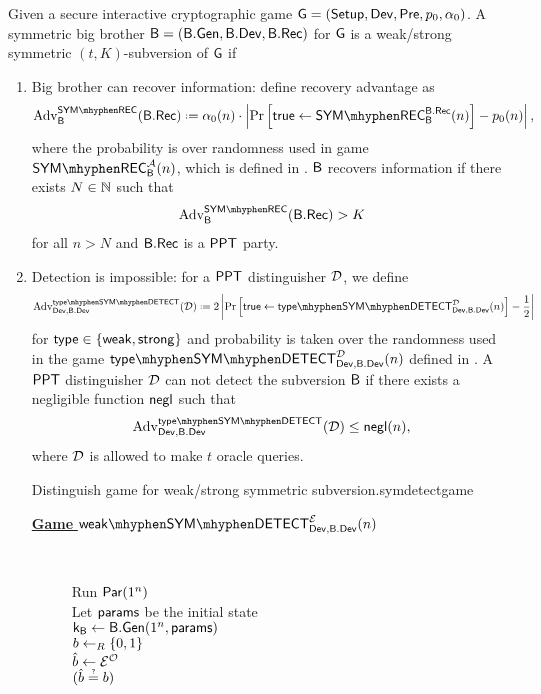 \begin{defn}
	Given a secure interactive cryptographic game $\operatorname{\mathsf{G}}=\left(\operatorname{\mathsf{Setup}},\operatorname{\mathsf{Dev}},\operatorname{\mathsf{Pre}},p_{0},\alpha_{0}\right)$. A symmetric big brother $\mathsf{B} = \left(\mathsf{B}.\mathsf{Gen},\mathsf{B}.\mathsf{Dev},\mathsf{B}.\mathsf{Rec}\right)$ for $\operatorname{\mathsf{G}}$ is a weak/strong symmetric $(t,K)$-subversion of $\operatorname{\mathsf{G}}$ if 
	\begin{enumerate}[1.]

		\item Big brother can recover information: define recovery advantage as
		\begin{align*} 
			\adv_{\bb}^{\symrecgame}(\bbrec)\defeq \secf(n)\cdot \left\vert \prob{\true\leftarrow \symrecgame_{\bb}^{\bbrec}(n)} - \basep(n)\right\vert,
		\end{align*}
		where the probability is over randomness used in game $\symrecgame_{\bb}^{\adve}(n)$, which is defined in . $\mathsf{B}$ recovers information if there exists $N\in\mathbb{N}$ such that
		\begin{align*}
			\adv_{\bb}^{\symrecgame}(\bbrec)>K
		\end{align*}
		for all $n>N$ and $\mathsf{B}.\mathsf{Rec}$ is a $\mathsf{PPT}$ party. 
		\item  Detection is impossible: for a $\mathsf{PPT}$ distinguisher $\operatorname{\mathcal{D}}$, we define 
		\begin{align*}
		\adv_{\dev,\bbdev}^{\symnotationtypedetect}(\dist) \defeq 2\left\vert \prob{\true\leftarrow \symtypedetect{\dev}{\bbdev}{\dist}}-\frac{1}{2}\right\vert 
		\end{align*}
		for $\mathsf{type}\in\{\mathsf{weak},\mathsf{strong}\}$ and probability is taken over the randomness used in the game $\symtypedetect{\dev}{\bbdev}{\dist}$ defined in . A $\mathsf{PPT}$ distinguisher $\operatorname{\mathcal{D}}$ can not detect the subversion $\mathsf{B}$ if there exists a negligible function $\operatorname{\mathsf{negl}}$ such that
		\begin{align*}
			\adv_{\dev,\bbdev}^{\symnotationtypedetect}(\dist)\leq \negl(n),
		\end{align*}
		where $\operatorname{\mathcal{D}}$ is allowed to make $t$ oracle queries.
		\begin{boxfigTwo}{Distinguish game for weak/strong symmetric subversion.}{symdetectgame}
\begin{minipage}{0.45\textwidth}
    \smallskip
	\begin{description}
 	\item[\underline{\textbf{Game} $\symweakdetect{\dev}{\bbdev}{\eve}$}] ~
 	
 	 	Run $\operatorname{\mathsf{Par}}(1^n)$\\
 		Let $\mathsf{params}$ be the initial state \\
 		$\mathsf{k}_{\mathsf{B}}\leftarrow \mathsf{B}.\mathsf{Gen}(1^n,\mathsf{params})$ \\
 		$b\leftarrow_R \{0,1\}$ \\
 		$\hat{b}\leftarrow \mathcal{E}^{\operatorname{\mathcal{O}}}$ \\
 		\Ret $\askequal{\hat{b}}{b}$


\end{description}
\end{minipage}
\end{boxfigTwo}
\end{enumerate}
\end{defn}
